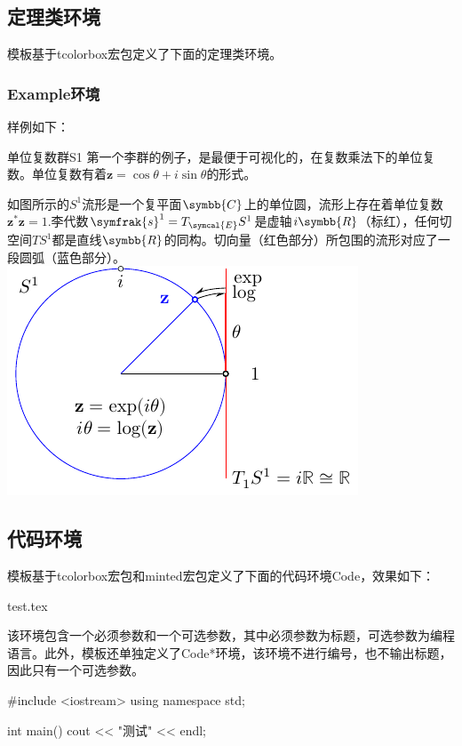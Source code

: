 \documentclass{gunote}
\begin{document}
\subsection{定理类环境}
模板基于\textsf{tcolorbox}宏包定义了下面的定理类环境。
\subsubsection{Example环境}
样例如下：
\begin{Example}[halign lower=flush center, sidebyside]{单位复数群}{S1}
  第一个李群的例子，是最便于可视化的，在复数乘法下的单位复数。单位复数有着$\symbf{z}=\cos\theta+i\sin\theta$的形式。

  如图所示的$S^1$流形是一个复平面$\symbb{C}$上的单位圆，流形上存在着单位复数$\symbf{z}^*\symbf{z}=1$.李代数$\symfrak{s}^1=T_{\symcal{E}}S^1$是虚轴$i\symbb{R}$（标红），任何切空间$TS^1$都是直线$\symbb{R}$的同构。切向量（红色部分）所包围的流形对应了一段圆弧（蓝色部分）。
  \tcblower
  \includegraphics{picture/manifold.pdf}
\end{Example}
\subsection{代码环境}
模板基于\textsf{tcolorbox}宏包和\textsf{minted}宏包定义了下面的代码环境\textsf{Code}，效果如下：
\begin{Code}{test.tex}
\end{Code}

该环境包含一个必须参数和一个可选参数，其中必须参数为标题，可选参数为编程语言。此外，模板还单独定义了\textsf{Code*}环境，该环境不进行编号，也不输出标题，因此只有一个可选参数。
\begin{Code*}[cpp]
#include <iostream>
using namespace std;

int main() {
  cout << "测试" << endl;
}
\end{Code*}
\end{document}
